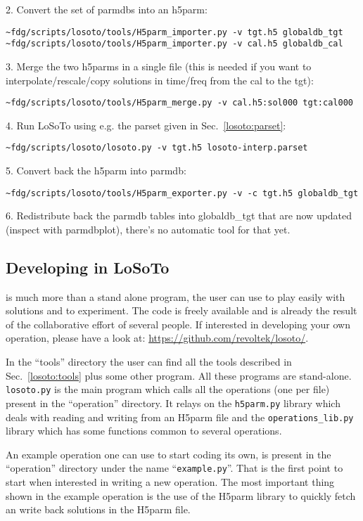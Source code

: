 \documentclass[structabstract]{article}
\begin{document}
2. Convert the set of parmdbs into an h5parm:
\begin{verbatim}
~fdg/scripts/losoto/tools/H5parm_importer.py -v tgt.h5 globaldb_tgt
~fdg/scripts/losoto/tools/H5parm_importer.py -v cal.h5 globaldb_cal
\end{verbatim}

3. Merge the two h5parms in a single file (this is needed if you want to interpolate/rescale/copy solutions in time/freq from the cal to the tgt):
\begin{verbatim}
~fdg/scripts/losoto/tools/H5parm_merge.py -v cal.h5:sol000 tgt:cal000
\end{verbatim}

4. Run LoSoTo using e.g. the parset given in Sec.~\ref{losoto:parset}:
\begin{verbatim}
~fdg/scripts/losoto/losoto.py -v tgt.h5 losoto-interp.parset
\end{verbatim}

5. Convert back the h5parm into parmdb:
\begin{verbatim}
~fdg/scripts/losoto/tools/H5parm_exporter.py -v -c tgt.h5 globaldb_tgt
\end{verbatim}

6. Redistribute back the parmdb tables into globaldb\_tgt that are now updated (inspect with parmdbplot), there's no automatic tool for that yet.

\subsection{Developing in LoSoTo}
\label{losoto:developing}
\losoto{} is much more than a stand alone program, the user can use \losoto{} to play easily with solutions and to experiment. The code is freely available and is already the result of the collaborative effort of several people. If interested in developing your own operation, please have a look at: \url{https://github.com/revoltek/losoto/}.

In the ``tools'' directory the user can find all the tools described in Sec.~\ref{losoto:tools} plus some other program. All these programs are stand-alone. \texttt{losoto.py} is the main program which calls all the operations (one per file) present in the ``operation'' directory. It relays on the \texttt{h5parm.py} library which deals with reading and writing from an H5parm file and the \texttt{operations\_lib.py} library which has some functions common to several operations.

An example operation one can use to start coding its own, is present in the ``operation'' directory under the name ``\texttt{example.py}''. That is the first point to start when interested in writing a new operation. The most important thing shown in the example operation is the use of the H5parm library to quickly fetch an write back solutions in the H5parm file.
\end{document}
